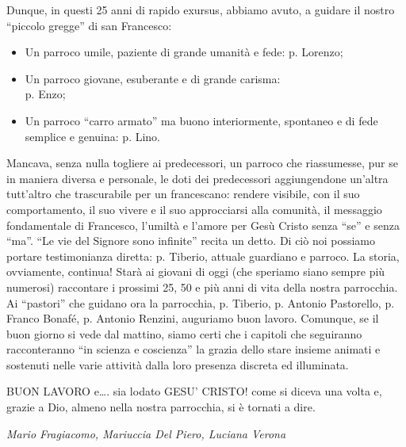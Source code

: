 Dunque, in questi 25 anni di rapido exursus, abbiamo avuto, a guidare il nostro “piccolo 
gregge” di san Francesco:
\begin{itemize}
	\item Un parroco umile, paziente di grande umanità e fede: p. Lorenzo;
	\item Un parroco giovane, esuberante e di grande carisma: \\p. Enzo;
	\item \sloppy Un parroco ``carro armato'' ma buono interiormente, spontaneo e di fede semplice e genuina: p. Lino.
\end{itemize}
Mancava, senza nulla togliere ai predecessori, un parroco che riassumesse, pur se in maniera 
diversa e personale, le doti dei predecessori aggiungendone un’altra tutt’altro che trascurabile per 
un francescano: rendere visibile, con il suo comportamento, il suo vivere e il suo approcciarsi alla 
comunità, il messaggio fondamentale di Francesco, l’umiltà e l’amore per Gesù Cristo senza “se” e 
senza “ma”.
“Le vie del Signore sono infinite” recita un detto. Di ciò noi possiamo portare testimonianza diretta: 
p. Tiberio, attuale guardiano e parroco. La storia, ovviamente, continua!
Starà ai giovani di oggi (che speriamo siano sempre più numerosi) raccontare i prossimi 25, 
50 e più anni di vita della nostra parrocchia. Ai “pastori” che guidano ora la parrocchia, p. Tiberio, 
p. Antonio Pastorello, p. Franco Bonafé, p. Antonio Renzini, auguriamo buon lavoro.
Comunque, se il buon giorno si vede dal mattino, siamo certi che i capitoli che seguiranno 
racconteranno “in scienza e coscienza” la grazia dello stare insieme animati e sostenuti nelle varie 
attività dalla loro presenza discreta ed illuminata.
\medbreak
\begin{samepage}
BUON LAVORO e…. sia lodato GESU’ CRISTO! come si diceva una volta e, grazie a Dio, 
almeno nella nostra parrocchia, si è tornati a dire.
\begin{flushright}
\textit{Mario Fragiacomo, Mariuccia Del Piero, Luciana Verona}
\end{flushright}
\end{samepage}